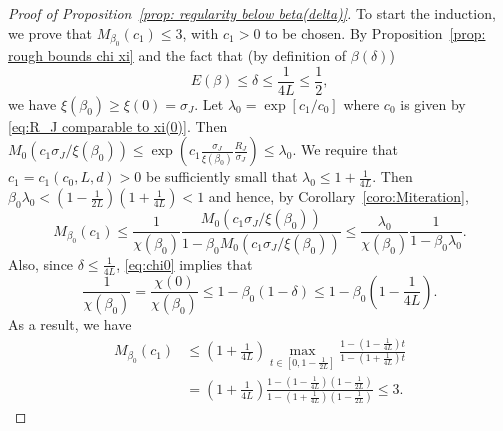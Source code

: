 \documentclass[11pt,a4paper]{article}
\numberwithin{equation}{section}
\theoremstyle{plain}
\theoremstyle{definition}
\newcommand\1{\mathds{1}}
\begin{document}
\begin{proof}[Proof of Proposition~\textup{\ref{prop: regularity below beta(delta)}}]
To start the induction, we prove that $M_{\beta_0}(c_1) \le 3$,
with $c_1>0$ to be chosen.
By Proposition~\ref{prop: rough bounds chi xi} and the fact that
(by definition of $\beta(\delta)$)
\begin{equation}
\label{eq:Edelta}
    E(\beta)\leq \delta\leq \frac{1}{4L}\leq \frac{1}{2},
\end{equation}
we have $\xi(\beta_0)\geq \xi(0)=\sigma_J$.
Let $\lambda_0 =\exp[c_1/c_0]$ where $c_0$ is given by \eqref{eq:R_J comparable to xi(0)}.
Then $M_0(c_1\sigma_J/\xi(\beta_0))\leq \exp(c_1\tfrac{\sigma_J}{\xi(\beta_0)}\tfrac{R_J}{\sigma_J})\leq \lambda_0$.
We require that $c_1=c_1(c_0,L,d)>0$ be sufficiently small that
$\lambda_0 \leq 1+\tfrac{1}{4L}$.
Then $\beta_0\lambda_0< (1-\tfrac{1}{2L})(1+\tfrac{1}{4L}) < 1$
and hence, by Corollary~\ref{coro:Miteration},
\begin{equation}
	M_{\beta_0}(c_1)\leq \frac{1}{\chi(\beta_0)}\frac{M_0(c_1\sigma_J/\xi(\beta_0))}{1-\beta_0M_0(c_1\sigma_J/\xi(\beta_0))}
\leq \frac{\lambda_0}{\chi(\beta_0)}\frac{1}{1-\beta_0 \lambda_0}.
\end{equation}
Also, since $\delta\leq \frac{1}{4L}$, \eqref{eq:chi0} implies that
\begin{equation}
	\frac{1}{\chi(\beta_0)}
    =
    \frac{\chi(0)}{\chi(\beta_0)}\leq 1-\beta_0(1-\delta)
    \leq 1-\beta_0\left(1-\frac{1}{4L}\right).
\end{equation}
As a result, we have
\begin{align}
\label{eq:proof reg1}
    M_{\beta_0}(c_1) & \le
    \left(1+\frac{1}{4L}\right)\max_{t\in [0,1-\tfrac{1}{2L}]}
    \frac{1-(1-\tfrac{1}{4L})t}{1-(1+\tfrac{1}{4L})t}
    \nonumber \\
    & =
    \left(1+\frac{1}{4L}\right)
    \frac{1-(1-\tfrac{1}{4L})(1-\tfrac{1}{2L})}{1-(1+\tfrac{1}{4L})(1-\tfrac{1}{2L})}\leq 3.
\end{align}



\end{proof}
\end{document}
